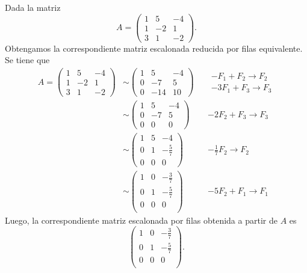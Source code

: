 \documentclass[compacto,10pt]{pubciencias-notas}
\begin{document}
\begin{ejem}\label{Ejem:EPF}\hspace{0pt} Dada la matriz
\[
    A=\begin{pmatrix}
    1&5&-4\\
    1&-2&1\\
    3&1&-2
    \end{pmatrix}.
\]
Obtengamos la correspondiente matriz escalonada reducida por filas equivalente. Se tiene que
\begin{align*}
A=\begin{pmatrix}
1&5&-4\\
1&-2&1\\
3&1&-2
\end{pmatrix}
& \sim 
\begin{pmatrix}
1&5&-4\\
0&-7&5\\
0&-14&10
\end{pmatrix}
&& \begin{array}{c}
    -F_1+F_2\rightarrow F_2\\
    -3F_1+F_3\rightarrow F_3
\end{array}\\
& \sim 
\begin{pmatrix}
1&5&-4\\
0&-7&5\\
0&0&0
\end{pmatrix}
&& -2F_2+F_3\rightarrow F_3\\
& \sim 
\begin{pmatrix}
1&5&-4\\
0&1&-\frac{5}{7}\\
0&0&0
\end{pmatrix}
&& -\frac{1}{7}F_2\rightarrow F_2\\
& \sim
\begin{pmatrix}
1&0&-\frac{3}{7}\\
0&1&-\frac{5}{7}\\
0&0&0\\
\end{pmatrix}
&&-5F_2+F_1\rightarrow F_1
\end{align*}
Luego, la correspondiente matriz escalonada por filas obtenida a partir de $A$ es
\[
    \begin{pmatrix}
    1&0&-\frac{3}{7}\\
    0&1&-\frac{5}{7}\\
    0&0&0\\
    \end{pmatrix}.
\]
\end{ejem}
\end{document}
